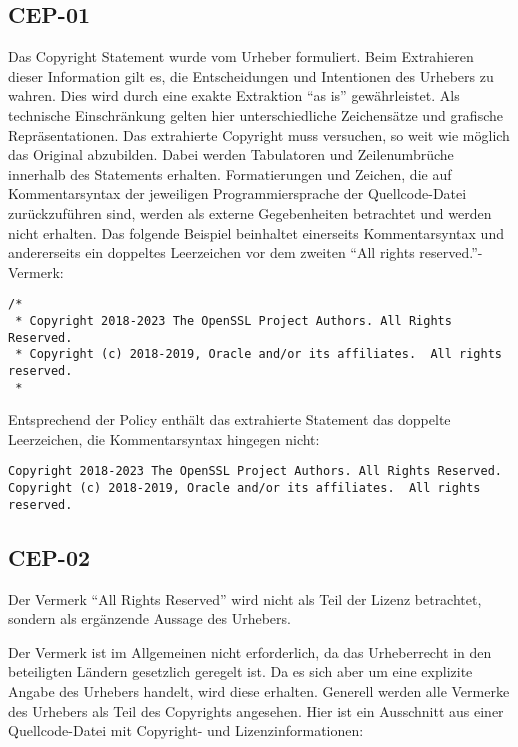 \subsection{CEP-01}\label{subsec:cep-01}

Das Copyright Statement wurde vom Urheber formuliert.
Beim Extrahieren dieser Information gilt es, die Entscheidungen und Intentionen des Urhebers zu wahren.
Dies wird durch eine exakte Extraktion \enquote{as is} gewährleistet.
Als technische Einschränkung gelten hier unterschiedliche Zeichensätze und grafische Repräsentationen.
Das extrahierte Copyright muss versuchen, so weit wie möglich das Original abzubilden.
Dabei werden Tabulatoren und Zeilenumbrüche innerhalb des Statements erhalten.
Formatierungen und Zeichen, die auf Kommentarsyntax der jeweiligen Programmiersprache der Quellcode-Datei zurückzuführen sind, werden als externe Gegebenheiten betrachtet und werden nicht erhalten.
Das folgende Beispiel beinhaltet einerseits Kommentarsyntax und andererseits ein doppeltes Leerzeichen vor dem zweiten \enquote{All rights reserved.}-Vermerk:

\begin{lstlisting}[keepspaces=true]
/*
 * Copyright 2018-2023 The OpenSSL Project Authors. All Rights Reserved.
 * Copyright (c) 2018-2019, Oracle and/or its affiliates.  All rights reserved.
 *
\end{lstlisting}

Entsprechend der Policy enthält das extrahierte Statement das doppelte Leerzeichen, die Kommentarsyntax hingegen nicht:
\begin{lstlisting}[keepspaces=true]
Copyright 2018-2023 The OpenSSL Project Authors. All Rights Reserved.
Copyright (c) 2018-2019, Oracle and/or its affiliates.  All rights reserved.
\end{lstlisting}


\subsection{CEP-02}\label{subsec:cep-02}

Der Vermerk \enquote{All Rights Reserved} wird nicht als Teil der Lizenz betrachtet, sondern als ergänzende Aussage des Urhebers.

Der Vermerk ist im Allgemeinen nicht erforderlich, da das Urheberrecht in den beteiligten Ländern gesetzlich geregelt ist.
Da es sich aber um eine explizite Angabe des Urhebers handelt, wird diese erhalten.
Generell werden alle Vermerke des Urhebers als Teil des Copyrights angesehen.
Hier ist ein Ausschnitt aus einer Quellcode-Datei mit Copyright- und Lizenzinformationen:

